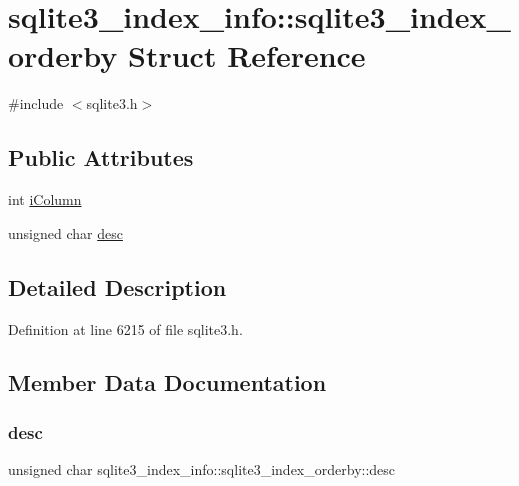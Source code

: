 \hypertarget{structsqlite3__index__info_1_1sqlite3__index__orderby}{}\section{sqlite3\+\_\+index\+\_\+info\+:\+:sqlite3\+\_\+index\+\_\+orderby Struct Reference}
\label{structsqlite3__index__info_1_1sqlite3__index__orderby}


{\ttfamily \#include $<$sqlite3.\+h$>$}

\subsection*{Public Attributes}
\begin{DoxyCompactItemize}
\item 
int \mbox{\hyperlink{structsqlite3__index__info_1_1sqlite3__index__orderby_a266396085bfda9acef3f13eaa170cd2f}{i\+Column}}
\item 
unsigned char \mbox{\hyperlink{structsqlite3__index__info_1_1sqlite3__index__orderby_a0586d1b5d36221af96aeba8cfc56e9c6}{desc}}
\end{DoxyCompactItemize}


\subsection{Detailed Description}


Definition at line 6215 of file sqlite3.\+h.



\subsection{Member Data Documentation}
\mbox{\label{structsqlite3__index__info_1_1sqlite3__index__orderby_a0586d1b5d36221af96aeba8cfc56e9c6}} 
\subsubsection{\texorpdfstring{desc}{desc}}
{\footnotesize\ttfamily unsigned char sqlite3\+\_\+index\+\_\+info\+::sqlite3\+\_\+index\+\_\+orderby\+::desc}



